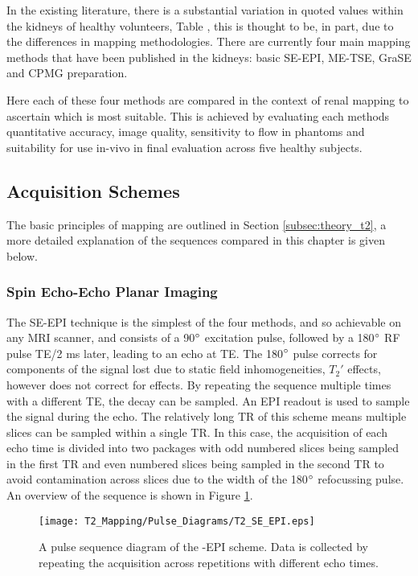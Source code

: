 In the existing literature, there is a substantial variation in quoted \ttwo values within the kidneys of healthy volunteers, Table , this is thought to be, in part, due to the differences in \ttwo mapping methodologies. There are currently four main \ttwo mapping methods that have been published in the kidneys: basic \ac{SE}-\ac{EPI}, \ac{ME-TSE}, \ac{GraSE} and \ac{CPMG} \ttwo preparation. 

Here each of these four methods are compared in the context of renal \ttwo mapping to ascertain which is most suitable. This is achieved by evaluating each methods quantitative accuracy, image quality, sensitivity to flow in phantoms and suitability for use in-vivo in final evaluation across five healthy subjects.

\subsection{\ttwo Acquisition Schemes}
The basic principles of \ttwo mapping are outlined in Section \ref{subsec:theory_t2}, a more detailed explanation of the sequences compared in this chapter is given below. 

\subsubsection{Spin Echo-Echo Planar Imaging}
The \acf{SE}-\acf{EPI} technique is the simplest of the four methods, and so achievable on any \ac{MRI} scanner, and consists of a 90$\degree$ excitation pulse, followed by a 180$\degree$ \ac{RF} pulse \ac{TE}/2 ms later, leading to an echo at \ac{TE}. The 180$\degree$ pulse corrects for components of the signal lost due to static field inhomogeneities, $T_2'$ effects, however does not correct for \ttwo effects. By repeating the sequence multiple times with a different \ac{TE}, the \ttwo decay can be sampled. An \ac{EPI} readout is used to sample the signal during the echo. The relatively long \ac{TR} of this scheme means multiple slices can be sampled within a single \ac{TR}. In this case, the acquisition of each echo time is divided into two packages with odd numbered slices being sampled in the first \ac{TR} and even numbered slices being sampled in the second \ac{TR} to avoid contamination across slices due to the width of the 180$\degree$ refocussing pulse. An overview of the sequence is shown in Figure \ref{fig:t2_se-epi_seq}.

\begin{figure}[H]
	\centering
	\texttt{[image: T2\_Mapping/Pulse\_Diagrams/T2\_SE\_EPI.eps]}
	\caption{A pulse sequence diagram of the -\ac{EPI} scheme. Data is collected by repeating the acquisition across repetitions with different echo times.}
	\label{fig:t2_se-epi_seq}	
\end{figure}

